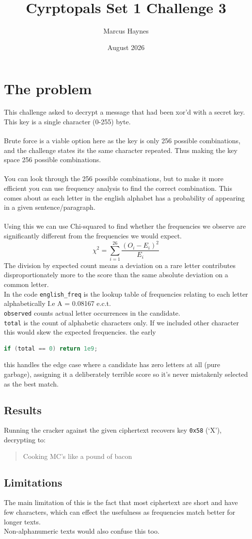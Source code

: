 \documentclass{article}
\title{Cyrptopals Set 1 Challenge 3}
\author{Marcus Haynes}
\date{August 2026}
\begin{document}
\maketitle

\section{The problem}
This challenge asked to decrypt a message that had been xor'd with a secret key. This key is a single character (0-255) byte.\\
\\
Brute force is a viable option here as the key is only 256 possible combinations, and the challenge states its the same character repeated. Thus making the key space 256 possible combinations.\\
\\
You can look through the 256 possible combinations, but to make it more efficient you can use frequency analysis to find the correct combination. This comes about as each letter in the english alphabet has a probability of appearing in a given sentence/paragraph.\\
\\
Using this we can use Chi-squared to find whether the frequencies we observe are significantly different from the frequencies we would expect. \[
\chi^2 = \sum_{i=1}^{26} \frac{(O_i - E_i)^2}{E_i}
\]
The division by expected count means a deviation on a rare letter contributes disproportionately more to the score than the same absolute deviation on a common letter.
\\
In the code \texttt{english\_freq} is the lookup table of frequencies relating to each letter alphabetically I.e A = 0.08167 e.c.t.\\ \texttt{observed} counts actual letter occurrences in the candidate. \\
\texttt{total} is the count of alphabetic characters only. If we included other character this would skew the expected frequencies.
the early \begin{lstlisting}[language=C++]
if (total == 0) return 1e9;
\end{lstlisting}
this handles the edge case where a candidate has zero letters at all (pure garbage), assigning it a deliberately terrible score so it's never mistakenly selected as the best match.  

\subsection{Results}
Running the cracker against the given ciphertext recovers key \texttt{0x58}
(`X'), decrypting to:
\begin{quote}
Cooking MC's like a pound of bacon
\end{quote}
\subsection{Limitations}
The main limitation of this is the fact that most ciphertext are short and have few characters, which can effect the usefulness as frequencies match better for longer texts.\\
Non-alphanumeric texts would also confuse this too.
\end{document}
